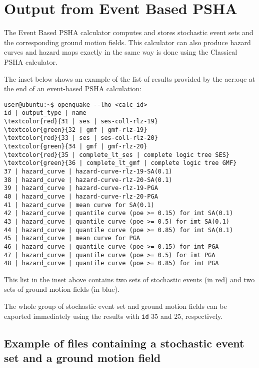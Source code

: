 \section{Output from Event Based PSHA}\label{EventBasedOutput}
%
The Event Based PSHA calculator computes and stores stochastic 
event sets and the corresponding ground motion fields. 
%
This calculator can also produce hazard curves and hazard maps
exactly in the same way is done using the Classical PSHA calculator.

The inset below shows an example of the list of results provided by 
the \gls{acr:oqe} at the end of an event-based PSHA calculation:
%
\begin{Verbatim}[frame=single, commandchars=\\\{\}, fontsize=\small]
user@ubuntu:~$ openquake --lho <calc_id> 
id | output_type | name
\textcolor{red}{31 | ses | ses-coll-rlz-19}
\textcolor{green}{32 | gmf | gmf-rlz-19}
\textcolor{red}{33 | ses | ses-coll-rlz-20}
\textcolor{green}{34 | gmf | gmf-rlz-20}
\textcolor{red}{35 | complete_lt_ses | complete logic tree SES}
\textcolor{green}{36 | complete_lt_gmf | complete logic tree GMF}
37 | hazard_curve | hazard-curve-rlz-19-SA(0.1)
38 | hazard_curve | hazard-curve-rlz-20-SA(0.1)
39 | hazard_curve | hazard-curve-rlz-19-PGA
40 | hazard_curve | hazard-curve-rlz-20-PGA
41 | hazard_curve | mean curve for SA(0.1)
42 | hazard_curve | quantile curve (poe >= 0.15) for imt SA(0.1)
43 | hazard_curve | quantile curve (poe >= 0.5) for imt SA(0.1)
44 | hazard_curve | quantile curve (poe >= 0.85) for imt SA(0.1)
45 | hazard_curve | mean curve for PGA
46 | hazard_curve | quantile curve (poe >= 0.15) for imt PGA
47 | hazard_curve | quantile curve (poe >= 0.5) for imt PGA
48 | hazard_curve | quantile curve (poe >= 0.85) for imt PGA
\end{Verbatim}
This list in the inset above contains two sets of stochastic events 
(in red) and two sets of ground motion fields (in blue).

The whole group of stochastic event set and ground motion fields can 
be exported immediately using the results with \texttt{id} 35 and 25,
respectively.

\subsection{Example of files containing a stochastic event set and a 
ground motion field}

